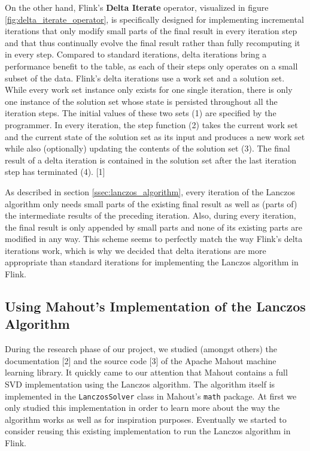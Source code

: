 On the other hand, Flink's \textbf{Delta Iterate} operator, visualized in
figure \ref{fig:delta_iterate_operator}, is specifically designed for
implementing incremental iterations that only modify small parts of the final
result in every iteration step and that thus continually evolve the final
result rather than fully recomputing it in every step. Compared to standard
iterations, delta iterations bring a performance benefit to the table, as each
of their steps only operates on a small subset of the data. Flink's delta
iterations use a work set and a solution set. While every work set instance
only exists for one single iteration, there is only one instance of the
solution set whose state is persisted throughout all the iteration steps. The
initial values of these two sets (1) are specified by the programmer. In every
iteration, the step function (2) takes the current work set and the current
state of the solution set as its input and produces a new work set while also
(optionally) updating the contents of the solution set (3). The final result of
a delta iteration is contained in the solution set after the last iteration
step has terminated (4). [1]


As described in section \ref{ssec:lanczos_algorithm}, every iteration of the
Lanczos algorithm only needs small parts of the existing final result as well
as (parts of) the intermediate results of the preceding iteration. Also, during
every iteration, the final result is only appended by small parts and none of
its existing parts are modified in any way. This scheme seems to perfectly
match the way Flink's delta iterations work, which is why we decided that delta
iterations are more appropriate than standard iterations for implementing the
Lanczos algorithm in Flink.



\subsection{Using Mahout's Implementation of the Lanczos Algorithm}

During the research phase of our project, we studied (amongst others) the
documentation [2] and the source code [3] of the Apache Mahout machine learning
library. It quickly came to our attention that Mahout contains a full SVD
implementation using the Lanczos algorithm. The algorithm itself is implemented
in the \texttt{LanczosSolver} class in Mahout's \texttt{math} package. At first
we only studied this implementation in order to learn more about the way the
algorithm works as well as for inspiration purposes. Eventually we started to
consider reusing this existing implementation to run the Lanczos algorithm in
Flink.

